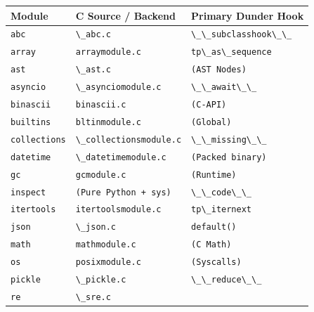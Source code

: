 \begin{longtable}[]{@{}lll@{}}
\toprule
Module & C Source / Backend & Primary Dunder Hook \\
\midrule
\endhead
\passthrough{\lstinline!abc!} & \passthrough{\lstinline!\_abc.c!} &
\passthrough{\lstinline!\_\_subclasshook\_\_!} \\
\passthrough{\lstinline!array!} &
\passthrough{\lstinline!arraymodule.c!} &
\passthrough{\lstinline!tp\_as\_sequence!} \\
\passthrough{\lstinline!ast!} & \passthrough{\lstinline!\_ast.c!} &
\passthrough{\lstinline!(AST Nodes)!} \\
\passthrough{\lstinline!asyncio!} &
\passthrough{\lstinline!\_asynciomodule.c!} &
\passthrough{\lstinline!\_\_await\_\_!} \\
\passthrough{\lstinline!binascii!} &
\passthrough{\lstinline!binascii.c!} &
\passthrough{\lstinline!(C-API)!} \\
\passthrough{\lstinline!builtins!} &
\passthrough{\lstinline!bltinmodule.c!} &
\passthrough{\lstinline!(Global)!} \\
\passthrough{\lstinline!collections!} &
\passthrough{\lstinline!\_collectionsmodule.c!} &
\passthrough{\lstinline!\_\_missing\_\_!} \\
\passthrough{\lstinline!datetime!} &
\passthrough{\lstinline!\_datetimemodule.c!} &
\passthrough{\lstinline!(Packed binary)!} \\
\passthrough{\lstinline!gc!} & \passthrough{\lstinline!gcmodule.c!} &
\passthrough{\lstinline!(Runtime)!} \\
\passthrough{\lstinline!inspect!} &
\passthrough{\lstinline!(Pure Python + sys)!} &
\passthrough{\lstinline!\_\_code\_\_!} \\
\passthrough{\lstinline!itertools!} &
\passthrough{\lstinline!itertoolsmodule.c!} &
\passthrough{\lstinline!tp\_iternext!} \\
\passthrough{\lstinline!json!} & \passthrough{\lstinline!\_json.c!} &
\passthrough{\lstinline!default()!} \\
\passthrough{\lstinline!math!} & \passthrough{\lstinline!mathmodule.c!}
& \passthrough{\lstinline!(C Math)!} \\
\passthrough{\lstinline!os!} & \passthrough{\lstinline!posixmodule.c!} &
\passthrough{\lstinline!(Syscalls)!} \\
\passthrough{\lstinline!pickle!} & \passthrough{\lstinline!\_pickle.c!}
& \passthrough{\lstinline!\_\_reduce\_\_!} \\
\passthrough{\lstinline!re!} & \passthrough{\lstinline!\_sre.c!} &

\end{longtable}
